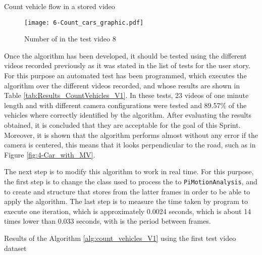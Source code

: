 \begin{algorithm}
{{{			}
		}	
	}
	\caption{Count vehicle flow in a stored video}\label{alg:count_vehicles_V1}
\end{algorithm}\DecMargin{1em}

\begin{figure}[!h]
	\begin{center}
		\texttt{[image: 6-Count\_cars\_graphic.pdf]}
		\caption{Number of  in the test video 8}
		\label{fig:6-Count_cars_graphic}
	\end{center}
\end{figure}

Once the algorithm has been developed, it should be tested using the different videos recorded previously as it was stated in the list of tests for the user story. For this purpose an automated test has been programmed, which executes the algorithm over the different videos recorded, and whose results are shown in Table \ref{tab:Results_CountVehicles_V1}. In these tests, 23 videos of one minute length and with different camera configurations were tested and 89.57\% of the vehicles where correctly identified by the algorithm. After evaluating the results obtained, it is concluded that they are acceptable for the goal of this Sprint. Moreover, it is shown that the algorithm performs almost without any error if the camera is centered, this means that it looks perpendicular to the road, such as in Figure \ref{fig:4-Car_with_MV}. 

The next step is to modify this algorithm to work in real time. For this purpose, the first step is to change the class used to process the  to \texttt{PiMotionAnalysis}, and to create and structure that stores  from the latter frames in order to be able to apply the algorithm. The last step is to measure the time taken by program to execute one iteration, which is approximately 0.0024 seconds, which is about 14 times lower than 0.033 seconds, with is the period between frames.

\begin{table}[!h]
	\centering
	{\small
		
	}
	\caption{Results of the Algorithm \ref{alg:count_vehicles_V1} using the first test video dataset}
	\label{tab:Results_CountVehicles_V1}
\end{table}


\newpage
